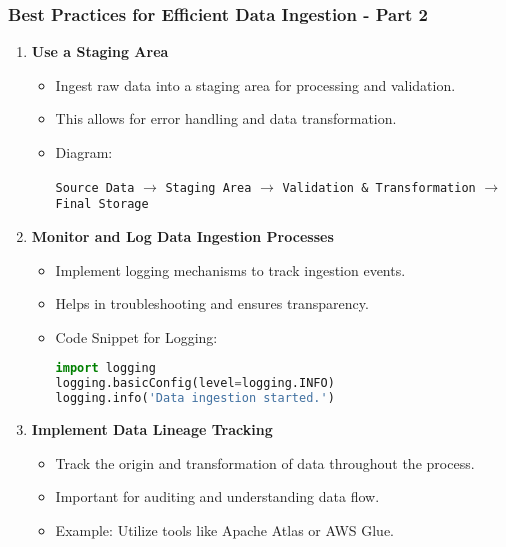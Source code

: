 \documentclass[aspectratio=169]{beamer}
\begin{document}
\begin{frame}[fragile]
    \frametitle{Best Practices for Efficient Data Ingestion - Part 2}
    \begin{enumerate}[resume]
        \item \textbf{Use a Staging Area}
        \begin{itemize}
            \item Ingest raw data into a staging area for processing and validation.
            \item This allows for error handling and data transformation.
            \item Diagram: 
            \begin{center}
                \texttt{Source Data} $\to$ \texttt{Staging Area} $\to$ \texttt{Validation \& Transformation} $\to$ \texttt{Final Storage}
            \end{center}
        \end{itemize}

        \item \textbf{Monitor and Log Data Ingestion Processes}
        \begin{itemize}
            \item Implement logging mechanisms to track ingestion events.
            \item Helps in troubleshooting and ensures transparency.
            \item Code Snippet for Logging:
            \begin{lstlisting}[language=Python]
import logging
logging.basicConfig(level=logging.INFO)
logging.info('Data ingestion started.')
            \end{lstlisting}
        \end{itemize}

        \item \textbf{Implement Data Lineage Tracking}
        \begin{itemize}
            \item Track the origin and transformation of data throughout the process.
            \item Important for auditing and understanding data flow.
            \item Example: Utilize tools like Apache Atlas or AWS Glue.
        \end{itemize}
    \end{enumerate}
\end{frame}
\end{document}

